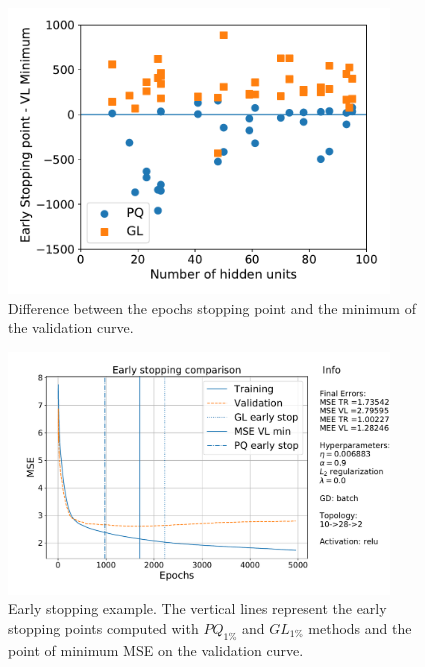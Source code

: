 \documentclass[11pt,twoside]{article}
\begin{document}
\begin{enumerate}
  \begin{figure}[htbp]
    \centering
    \includegraphics[width=0.90\textwidth]{img/early_stop_point.pdf}
    \caption{Difference between the epochs stopping point and the minimum of the validation curve.}
    \label{fig:early_stop_point}
  \end{figure}
  
  
    \begin{figure}[htbp]
    \centering
    \includegraphics[width=0.90\textwidth]{img/learning_early_0.pdf}
    \caption{ Early stopping example. The vertical lines represent the early stopping points computed with $PQ_{1\%}$ and $GL_{1\%}$ methods and the point of minimum MSE on the validation curve.}

    \label{fig:learning_early}
  \end{figure}




\end{enumerate}
\end{document}
